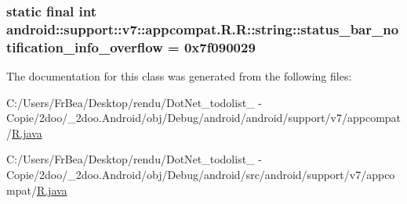 \hypertarget{classandroid_1_1support_1_1v7_1_1appcompat_1_1_r_1_1string_3b5bdb116442e610ff1360401e17ca4a}{
\subsubsection[{status\_\-bar\_\-notification\_\-info\_\-overflow}]{\setlength{\rightskip}{0pt plus 5cm}static final int android::support::v7::appcompat.R.R::string::status\_\-bar\_\-notification\_\-info\_\-overflow = 0x7f090029}}
\label{classandroid_1_1support_1_1v7_1_1appcompat_1_1_r_1_1string_3b5bdb116442e610ff1360401e17ca4a}




The documentation for this class was generated from the following files:\begin{CompactItemize}
\item 
C:/Users/FrBea/Desktop/rendu/DotNet\_\-todolist\_ - Copie/2doo/\_\-2doo.Android/obj/Debug/android/android/support/v7/appcompat/\hyperlink{android_2support_2v7_2appcompat_2_r_8java}{R.java}\item 
C:/Users/FrBea/Desktop/rendu/DotNet\_\-todolist\_ - Copie/2doo/\_\-2doo.Android/obj/Debug/android/src/android/support/v7/appcompat/\hyperlink{src_2android_2support_2v7_2appcompat_2_r_8java}{R.java}\end{CompactItemize}

